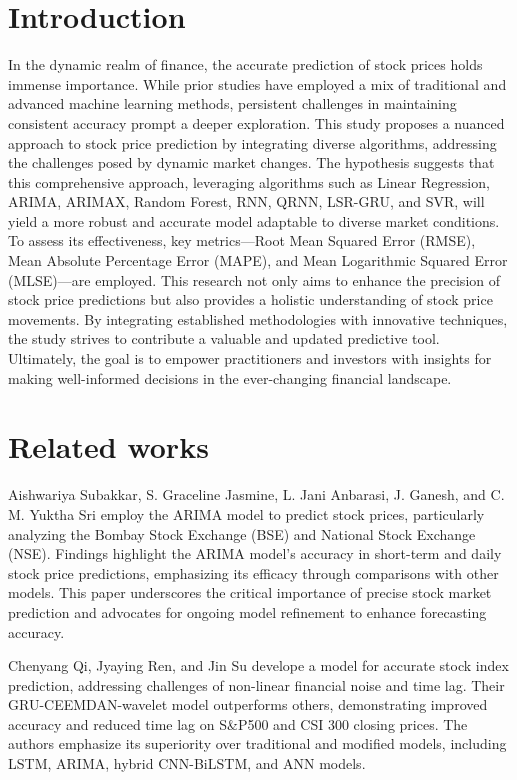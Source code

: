 \documentclass{ieeeojies}
\begin{document}
\section{Introduction}
\label{sec:introduction}
In the dynamic realm of finance, the accurate prediction of stock prices holds immense importance. While prior studies have employed a mix of traditional and advanced machine learning methods, persistent challenges in maintaining consistent accuracy prompt a deeper exploration. This study proposes a nuanced approach to stock price prediction by integrating diverse algorithms, addressing the challenges posed by dynamic market changes.
The hypothesis suggests that this comprehensive approach, leveraging algorithms such as Linear Regression, ARIMA, ARIMAX, Random Forest, RNN, QRNN, LSR-GRU, and SVR, will yield a more robust and accurate model adaptable to diverse market conditions. To assess its effectiveness, key metrics—Root Mean Squared Error (RMSE), Mean Absolute Percentage Error (MAPE), and Mean Logarithmic Squared Error (MLSE)—are employed.
This research not only aims to enhance the precision of stock price predictions but also provides a holistic understanding of stock price movements. By integrating established methodologies with innovative techniques, the study strives to contribute a valuable and updated predictive tool. Ultimately, the goal is to empower practitioners and investors with insights for making well-informed decisions in the ever-changing financial landscape.


\section{Related works}
Aishwariya Subakkar, S. Graceline Jasmine, L. Jani Anbarasi, J. Ganesh, and C. M. Yuktha Sri \cite{r1} employ the ARIMA model to predict stock prices, particularly analyzing the Bombay Stock Exchange (BSE) and National Stock Exchange (NSE). Findings highlight the ARIMA model's accuracy in short-term and daily stock price predictions, emphasizing its efficacy through comparisons with other models. This paper underscores the critical importance of precise stock market prediction and advocates for ongoing model refinement to enhance forecasting accuracy.

Chenyang Qi, Jyaying Ren, and Jin Su \cite{r2} develope a model for accurate stock index prediction, addressing challenges of non-linear financial noise and time lag. Their GRU-CEEMDAN-wavelet model outperforms others, demonstrating improved accuracy and reduced time lag on S\&P500 and CSI 300 closing prices. The authors emphasize its superiority over traditional and modified models, including LSTM, ARIMA, hybrid CNN-BiLSTM, and ANN models.
\end{document}
